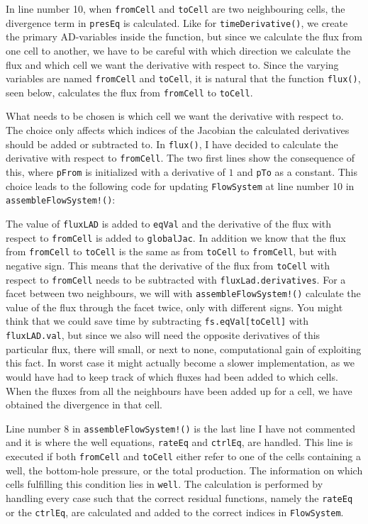 In line number 10, when \texttt{fromCell} and \texttt{toCell} are two neighbouring cells, the divergence term in \texttt{presEq} is calculated. Like for \texttt{timeDerivative()}, we create the primary AD-variables inside the function, but since we calculate the flux from one cell to another, we have to be careful with which direction we calculate the flux and which cell we want the derivative with respect to. Since the varying variables are named \texttt{fromCell} and \texttt{toCell}, it is natural that the function \texttt{flux()}, seen below, calculates the flux from \texttt{fromCell} to \texttt{toCell}. 

What needs to be chosen is which cell we want the derivative with respect to. The choice only affects which indices of the Jacobian the calculated derivatives should be added or subtracted to. In \texttt{flux()}, I have decided to calculate the derivative with respect to \texttt{fromCell}. The two first lines show the consequence of this, where \texttt{pFrom} is initialized with a derivative of $1$ and \texttt{pTo} as a constant. This choice leads to the following code for updating \texttt{FlowSystem} at line number 10 in \texttt{assembleFlowSystem!()}:

The value of \texttt{fluxLAD} is added to \texttt{eqVal} and the derivative of the flux with respect to \texttt{fromCell} is added to \texttt{globalJac}. In addition we know that the flux from \texttt{fromCell} to \texttt{toCell} is the same as from \texttt{toCell} to \texttt{fromCell}, but with negative sign. This means that the derivative of the flux from \texttt{toCell} with respect to \texttt{fromCell} needs to be subtracted with \texttt{fluxLad.derivatives}. For a facet between two neighbours, we will with \texttt{assembleFlowSystem!()} calculate the value of the flux through the facet twice, only with different signs. You might think that we could save time by subtracting \texttt{fs.eqVal[toCell]} with \texttt{fluxLAD.val}, but since we also will need the opposite derivatives of this particular flux, there will small, or next to none, computational gain of exploiting this fact. In worst case it might actually become a slower implementation, as we would have had to keep track of which fluxes had been added to which cells. When the fluxes from all the neighbours have been added up for a cell, we have obtained the divergence in that cell. 

Line number 8 in \texttt{assembleFlowSystem!()} is the last line I have not commented and it is where the well equations, \texttt{rateEq} and \texttt{ctrlEq}, are handled. This line is executed if both \texttt{fromCell} and \texttt{toCell} either refer to one of the cells containing a well, the bottom-hole pressure, or the total production. The information on which cells fulfilling this condition lies in \texttt{well}. The calculation is performed by handling every case such that the correct residual functions, namely the \texttt{rateEq} or the \texttt{ctrlEq}, are calculated and added to the correct indices in \texttt{FlowSystem}.

